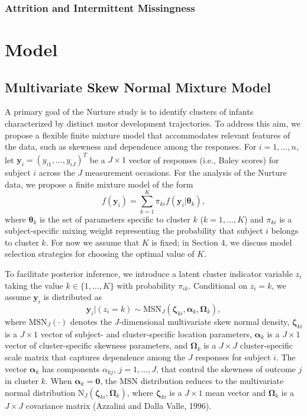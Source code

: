 \documentclass[useAMS,referee]{biom}
\begin{document}
\subsubsection{Attrition and Intermittent Missingness}

\newpage

\section{Model}
\label{s:model}

\subsection{Multivariate Skew Normal Mixture Model}

A primary goal of the Nurture study is to identify clusters of infants characterized by distinct motor development trajectories. To address this aim, we propose a flexible finite mixture model that accommodates relevant features of the data, such as skewness and dependence among the responses. For $i = 1,...,n$, let $\mathbf{y}_{i}=(y_{i1},\ldots,y_{iJ})^T$ be a $J \times 1$ vector of responses (i.e., Baley scores) for subject $i$ across the $J$ measurement occasions. For the analysis of the Nurture data, we propose a finite mixture model of the form
\begin{equation}
f(\mathbf{y}_i) = \sum_{k = 1}^{K} \pi_{ki} f(\mathbf{y}_i|\boldsymbol\theta_k),
\end{equation}
where $\boldsymbol\theta_k$ is the set of parameters specific to cluster $k$ ($k = 1,...,K$) and $\pi_{ki}$ is a subject-specific mixing weight representing the probability that subject $i$ belongs to cluster $k$. For now we assume that $K$ is fixed; in Section 4, we discuss model selection strategies for choosing the optimal value of $K$. 

To facilitate posterior inference, we introduce a latent cluster indicator variable $z_i$ taking the value $k \in \{1,...,K\}$ with probability $\pi_{ik}$. Conditional on $z_i = k$, we assume $\mathbf{y}_{i}$ is distributed as
\begin{equation}
\mathbf{y}_{i}|(z_i=k) \sim \text{MSN}_J(\boldsymbol\zeta_{ki},\boldsymbol\alpha_k,\boldsymbol\Omega_k), \label{eq:msndens}
\end{equation}
where $\text{MSN}_J(\cdot)$ denotes the $J$-dimensional multivariate skew normal density, $\boldsymbol\zeta_{ki}$ is a $J \times 1$ vector of subject- and cluster-specific location parameters, $\boldsymbol\alpha_k$ is a $J \times 1$ vector of cluster-specific skewness parameters, and $\boldsymbol\Omega_k$ is a $J \times J$ cluster-specific scale matrix that captures dependence among the $J$ responses for subject $i$. The vector $\boldsymbol\alpha_k$ has components $\alpha_{kj}$, $j = 1,...,J$, that control the skewness of outcome $j$ in cluster $k$. When $\boldsymbol\alpha_k = \mathbf{0}$, the MSN distribution reduces to the multivariate normal distribution $\text{N}_J(\boldsymbol\zeta_{ki},\boldsymbol\Omega_k)$, where $\boldsymbol\zeta_{ki}$ is a $J \times 1$ mean vector and $\boldsymbol\Omega_k$ is a $J \times J$ covariance matrix (Azzalini and Dalla Valle, 1996).
\end{document}
